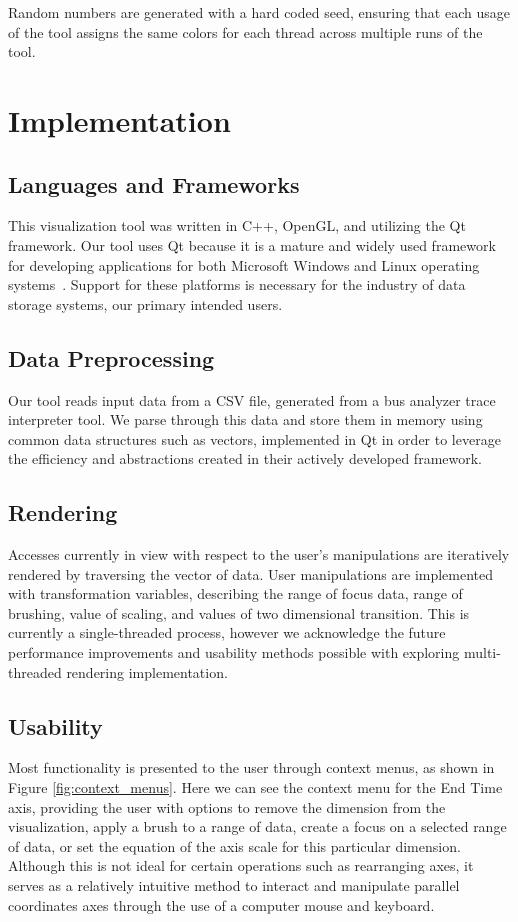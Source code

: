 \documentclass[12pt]{ucthesis}
\begin{document}
Random numbers are generated with a hard coded seed, ensuring that each usage of the tool assigns the same colors for each thread across multiple runs of the tool.

\section{Implementation}

\subsection{Languages and Frameworks}
This visualization tool was written in C++, OpenGL, and utilizing the Qt framework. Our tool uses Qt because it is a mature and widely used framework for developing applications for both Microsoft Windows and Linux operating systems~\cite{qt:nokia}. Support for these platforms is necessary for the industry of data storage systems, our primary intended users.

\subsection{Data Preprocessing}
Our tool reads input data from a CSV file, generated from a bus analyzer trace interpreter tool. We parse through this data and store them in memory using common data structures such as vectors, implemented in Qt in order to leverage the efficiency and abstractions created in their actively developed framework. 

\subsection{Rendering}
Accesses currently in view with respect to the user's manipulations are iteratively rendered by traversing the vector of data. User manipulations are implemented with transformation variables, describing the range of focus data, range of brushing, value of scaling, and values of two dimensional transition. This is currently a single-threaded process, however we acknowledge the future performance improvements and usability methods possible with exploring multi-threaded rendering implementation.

\subsection{Usability}
Most functionality is presented to the user through context menus, as shown in Figure \ref{fig:context_menus}. Here we can see the context menu for the End Time axis, providing the user with options to remove the dimension from the visualization, apply a brush to a range of data, create a focus on a selected range of data, or set the equation of the axis scale for this particular dimension. Although this is not ideal for certain operations such as rearranging axes, it serves as a relatively intuitive method to interact and manipulate parallel coordinates axes through the use of a computer mouse and keyboard.
\end{document}

